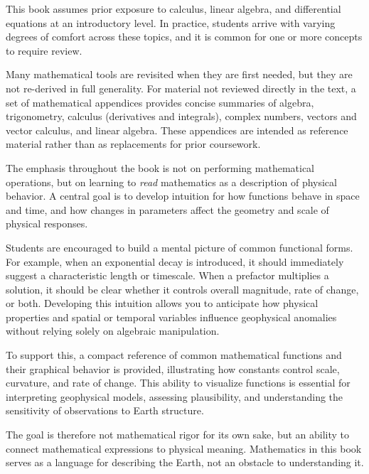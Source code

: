 This book assumes prior exposure to calculus, linear algebra, and differential equations at an introductory level. In practice, students arrive with varying degrees of comfort across these topics, and it is common for one or more concepts to require review.

Many mathematical tools are revisited when they are first needed, but they are not re-derived in full generality. For material not reviewed directly in the text, a set of mathematical appendices provides concise summaries of algebra, trigonometry, calculus (derivatives and integrals), complex numbers, vectors and vector calculus, and linear algebra. These appendices are intended as reference material rather than as replacements for prior coursework.

The emphasis throughout the book is not on performing mathematical operations, but on learning to \emph{read} mathematics as a description of physical behavior. A central goal is to develop intuition for how functions behave in space and time, and how changes in parameters affect the geometry and scale of physical responses.

Students are encouraged to build a mental picture of common functional forms.  For example, when an exponential decay is introduced, it should immediately suggest a characteristic length or timescale. When a prefactor multiplies a solution, it should be clear whether it controls overall magnitude, rate of change, or both. Developing this intuition allows you to anticipate how physical properties and spatial or temporal variables influence geophysical anomalies without relying solely on algebraic manipulation.

To support this, a compact reference of common mathematical functions and their graphical behavior is provided, illustrating how constants control scale, curvature, and rate of change. This ability to visualize functions is essential for interpreting geophysical models, assessing plausibility, and understanding the sensitivity of observations to Earth structure.

The goal is therefore not mathematical rigor for its own sake, but an ability to connect mathematical expressions to physical meaning. Mathematics in this book serves as a language for describing the Earth, not an obstacle to understanding it.


